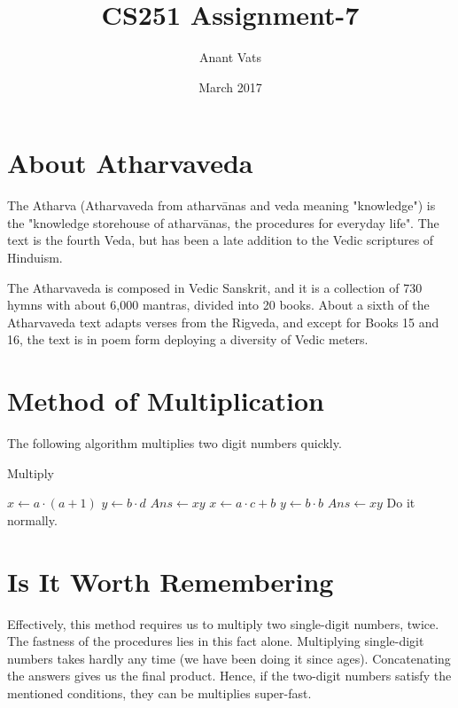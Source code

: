 \documentclass{article}
\title{CS251 Assignment-7}
\author{Anant Vats }
\date{March 2017}
\begin{document}
\maketitle
\section{About Atharvaveda}
The Atharva (Atharvaveda from atharvānas and veda meaning "knowledge") is the "knowledge storehouse of atharvānas, the procedures for everyday life". The text is the fourth Veda, but has been a late addition to the Vedic scriptures of Hinduism.\cite{wikicite1}

The Atharvaveda is composed in Vedic Sanskrit, and it is a collection of 730 hymns with about 6,000 mantras, divided into 20 books. About a sixth of the Atharvaveda text adapts verses from the Rigveda, and except for Books 15 and 16, the text is in poem form deploying a diversity of Vedic meters.\cite{wikicite1} 

\section{Method of Multiplication}
The following algorithm multiplies two digit numbers quickly.
\begin{algorithm}
\caption{Multiply}\label{Merge}
\begin{algorithmic}[1]
  
\State $x\gets a\cdot (a+1)$
\State $y\gets b\cdot d$
\State $Ans\gets xy$
\EndIf
{} 
\State $x\gets a\cdot c+b$
\State$y\gets b\cdot b$
\State$Ans\gets xy$
\Else
\State Do it normally.
\EndIf
\EndProcedure
\Statex

\end{algorithmic}
\end{algorithm}

\section{Is It Worth Remembering}

Effectively, this method requires us to multiply two single-digit numbers, twice. The fastness of the procedures lies in this fact alone. Multiplying single-digit numbers takes hardly any time (we have been doing it since ages). Concatenating the answers gives us the final product. Hence, if the two-digit numbers satisfy the mentioned conditions, they can be multiplies super-fast.
\end{document}
